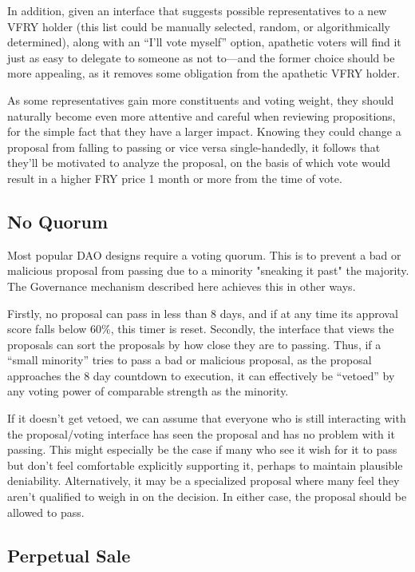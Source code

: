 \documentclass{article}
\begin{document}
In addition, given an interface that suggests possible representatives to a new VFRY holder (this list could be manually selected, random, or algorithmically determined), along with an ``I'll vote myself'' option, apathetic voters will find it just as easy to delegate to someone as not to---and the former choice should be more appealing, as it removes some obligation from the apathetic VFRY holder.

As some representatives gain more constituents and voting weight, they should naturally become even more attentive and careful when reviewing propositions, for the simple fact that they have a larger impact. Knowing they could change a proposal from falling to passing or vice versa single-handedly, it follows that they'll be motivated to analyze the proposal, on the basis of which vote would result in a higher FRY price 1 month or more from the time of vote.

\subsection{No Quorum}

Most popular DAO designs require a voting quorum. This is to prevent a bad or malicious proposal from passing due to a minority "sneaking it past" the majority. The Governance mechanism described here achieves this in other ways.

Firstly, no proposal can pass in less than 8 days, and if at any time its approval score falls below 60\%, this timer is reset. Secondly, the interface that views the proposals can sort the proposals by how close they are to passing. Thus, if a ``small minority'' tries to pass a bad or malicious proposal, as the proposal approaches the 8 day countdown to execution, it can effectively be ``vetoed'' by any voting power of comparable strength as the minority.

If it doesn't get vetoed, we can assume that everyone who is still interacting with the proposal/voting interface has seen the proposal and has no problem with it passing. This might especially be the case if many who see it wish for it to pass but don't feel comfortable explicitly supporting it, perhaps to maintain plausible deniability. Alternatively, it may be a specialized proposal where many feel they aren't qualified to weigh in on the decision. In either case, the proposal should be allowed to pass.

\subsection{Perpetual Sale} \label{perpetual-sale}
\end{document}
